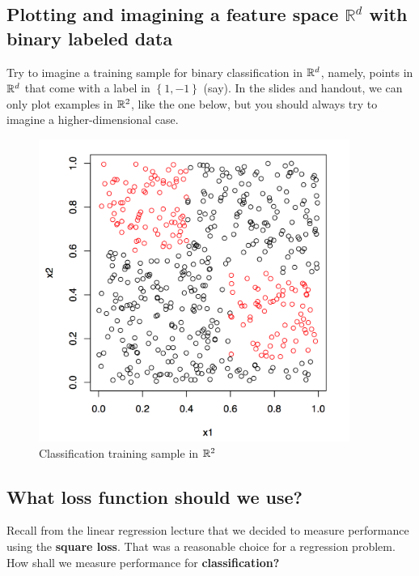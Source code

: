 \documentclass[11pt]{article}
\newcommand{\R}{\ensuremath{\mathbb{R}}}
\begin{document}
  \subsection{Plotting and imagining a feature space $\R^d$ with binary labeled data}

  Try to imagine a training sample for binary classification in $\mathbb{R}^d$,
  namely, points in $\mathbb{R}^d$ that come with a label in $\left\{ 1,-1
  \right\}$ (say). 
  In the slides and handout, we can only plot examples in $\mathbb{R}^2$, like the
  one below, but you
  should always try to imagine a higher-dimensional case.
  
  \begin{figure}[h!]
      \centering
      \includegraphics[width=4in]{tree1}
      \caption{Classification training sample in $\mathbb{R}^2$}
    \end{figure}
 
   

  \subsection{What loss function should we use?}

  Recall from the linear regression lecture that we decided to measure
  performance using the {\bf square loss}. That was a reasonable choice for a
  regression problem. How shall we measure performance for {\bf classification?}
\end{document}
